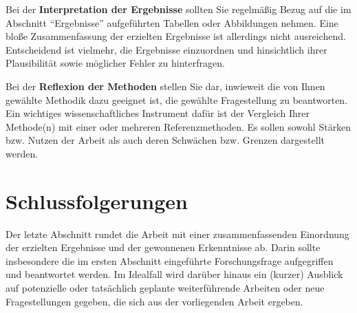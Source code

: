 \documentclass{svproc}
\begin{document}
Bei der \textbf{Interpretation der Ergebnisse} sollten Sie regelmäßig Bezug auf die im Abschnitt ``Ergebnisse'' aufgeführten Tabellen oder Abbildungen nehmen. Eine bloße Zusammenfassung der erzielten Ergebnisse ist allerdings nicht ausreichend. Entscheidend ist vielmehr, die Ergebnisse einzuordnen und hinsichtlich ihrer Plausibilität sowie möglicher Fehler zu hinterfragen.
    
Bei der \textbf{Reflexion der Methoden} stellen Sie dar, inwieweit die von Ihnen gewählte Methodik dazu geeignet ist, die gewählte Fragestellung zu beantworten. Ein wichtiges wissenschaftliches Instrument dafür ist der Vergleich Ihrer Methode(n) mit einer oder mehreren Referenzmethoden. Es sollen sowohl Stärken bzw. Nutzen der Arbeit als auch deren Schwächen bzw. Grenzen dargestellt werden.
%
%
\section{Schlussfolgerungen}
%
Der letzte Abschnitt rundet die Arbeit mit einer zusammenfassenden Einordnung der erzielten Ergebnisse und der gewonnenen Erkenntnisse ab. Darin sollte insbesondere die im ersten Abschnitt eingeführte Forschungsfrage aufgegriffen und beantwortet werden. Im Idealfall wird darüber hinaus ein (kurzer) Ausblick auf potenzielle oder tatsächlich geplante weiterführende Arbeiten oder neue Fragestellungen gegeben, die sich aus der vorliegenden Arbeit ergeben.


%
%
%


\end{document}
